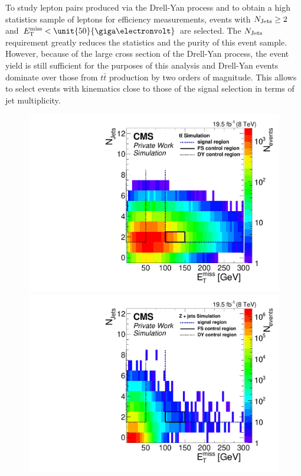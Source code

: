 To study lepton pairs produced via the Drell-Yan process and to obtain a high statistics sample of leptons for efficiency measurements, events with $N_\text{Jets} \geq 2$ and $\MET < \unit{50}{\giga\electronvolt}$ are selected. The $N_\text{Jets}$ requirement greatly reduces the statistics and the purity of this event sample. However, because of the large cross section of the Drell-Yan process, the event yield is still sufficient for the purposes of this analysis and Drell-Yan events dominate over those from $t\bar{t}$ production by two orders of magnitude. This allows to select events with kinematics close to those of the signal selection in terms of jet multiplicity.
\begin{figure}[htbp]
\centering
\begin{minipage}[t]{0.49\textwidth}
  \includegraphics[width=\textwidth]{plots/SELECTION/metJetsScatter_ttbar.pdf}
\end{minipage}
\begin{minipage}[t]{0.49\textwidth}
\includegraphics[width=\textwidth]{plots/SELECTION/metJetsScatter_DY.pdf}

\end{minipage}
\end{figure}
